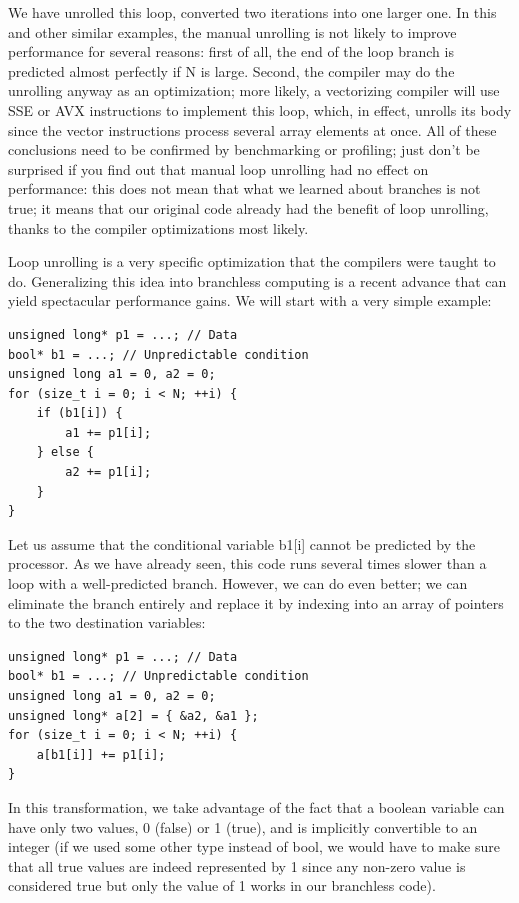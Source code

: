 We have unrolled this loop, converted two iterations into one larger one. In this and other similar examples, the manual unrolling is not likely to improve performance for several reasons: first of all, the end of the loop branch is predicted almost perfectly if N is large. Second, the compiler may do the unrolling anyway as an optimization; more likely, a vectorizing compiler will use SSE or AVX instructions to implement this loop, which, in effect, unrolls its body since the vector instructions process several array elements at once. All of these conclusions need to be confirmed by benchmarking or profiling; just don't be surprised if you find out that manual loop unrolling had no effect on performance: this does not mean that what we learned about branches is not true; it means that our original code already had the benefit of loop unrolling, thanks to the compiler optimizations most likely.


Loop unrolling is a very specific optimization that the compilers were taught to do. Generalizing this idea into branchless computing is a recent advance that can yield spectacular performance gains. We will start with a very simple example:

\begin{lstlisting}[style=styleCXX]
unsigned long* p1 = ...; // Data
bool* b1 = ...; // Unpredictable condition
unsigned long a1 = 0, a2 = 0;
for (size_t i = 0; i < N; ++i) {
	if (b1[i]) {
		a1 += p1[i];
	} else {
		a2 += p1[i];
	}
}
\end{lstlisting}

Let us assume that the conditional variable b1[i] cannot be predicted by the processor. As we have already seen, this code runs several times slower than a loop with a well-predicted branch. However, we can do even better; we can eliminate the branch entirely and replace it by indexing into an array of pointers to the two destination variables:

\begin{lstlisting}[style=styleCXX]
unsigned long* p1 = ...; // Data
bool* b1 = ...; // Unpredictable condition
unsigned long a1 = 0, a2 = 0;
unsigned long* a[2] = { &a2, &a1 };
for (size_t i = 0; i < N; ++i) {
	a[b1[i]] += p1[i];
}
\end{lstlisting}

In this transformation, we take advantage of the fact that a boolean variable can have only two values, 0 (false) or 1 (true), and is implicitly convertible to an integer (if we used some other type instead of bool, we would have to make sure that all true values are indeed represented by 1 since any non-zero value is considered true but only the value of 1 works in our branchless code).

